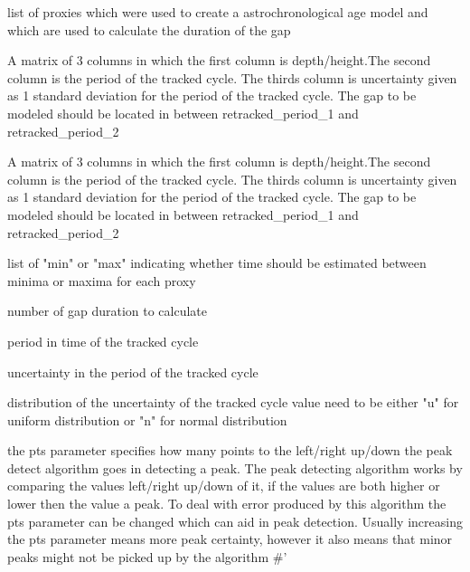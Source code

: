 \documentclass[a4paper]{book}
\begin{document}
\begin{Arguments}
\begin{ldescription}
\item[\code{proxies}] list of proxies which were used to create a astrochronological
age model and which are used to calculate the duration of the gap

\item[\code{retracked\_period\_1}] A matrix of 3 columns in which the first column
is depth/height.The second column is the period of the tracked cycle.
The thirds column is uncertainty given as 1 standard deviation for the
period of the tracked cycle. The gap to be modeled should be located
in between retracked\_period\_1 and retracked\_period\_2

\item[\code{retracked\_period\_2}] A matrix of 3 columns in which the first column
is depth/height.The second column is the period of the tracked cycle.
The thirds column is uncertainty given as 1 standard deviation for the
period of the tracked cycle. The gap to be modeled should be located
in between retracked\_period\_1 and retracked\_period\_2

\item[\code{min\_max}] list of "min" or "max" indicating whether time should be
estimated between minima or maxima for each proxy

\item[\code{n\_simulations}] number of gap duration to calculate

\item[\code{tracked\_cycle\_period}] period in time of the tracked cycle

\item[\code{tracked\_cycle\_period\_unc}] uncertainty in the period of the tracked cycle

\item[\code{tracked\_cycle\_period\_unc\_dist}] distribution of the uncertainty of the
tracked cycle value need to be either "u" for uniform distribution or
"n" for normal distribution  

\item[\code{pts}] the pts parameter specifies how many points to the left/right up/down the peak detect algorithm goes in detecting
a peak. The peak detecting algorithm works by comparing the values left/right up/down of it, if the values are both higher or lower
then the value a peak. To deal with error produced by this algorithm the pts parameter can be changed which can
aid in peak detection. Usually increasing the pts parameter means more peak certainty, however it also means that minor peaks might not be
picked up by the algorithm \#'


\end{ldescription}
\end{Arguments}
\end{document}
